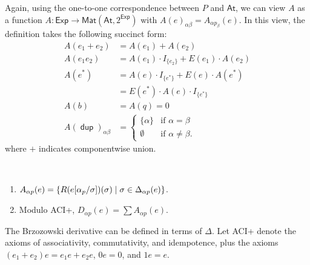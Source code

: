\documentclass{article}
\newcommand\At{\ensuremath{\mathsf{At}}}
\newcommand\ssum{\mathop{\textstyle\sum}}
\newcommand\pdup{\mathop{\mathsf{dup}}}
\newcommand\Exp{\mathsf{Exp}}
\renewcommand\star{^{\textstyle *}}
\renewcommand\powerset[1]{2^{#1}}
\newcommand\repname{R}
\newcommand\rep[2]{\repname(#2)(#1)}
\newcommand\STD{\Delta}
\newcommand\Anti{A}
\newcommand\Mat[2]{\mathsf{Mat}(#1,#2)}
\begin{document}
Again, using the one-to-one correspondence between $P$ and $\At$, we can view $A$ as a function $A:\Exp\to\Mat\At{\powerset\Exp}$
with $A(e)_{\alpha\beta}=A_{\alpha p_\beta}(e)$. In this view, the definition takes the following succinct form:
\begin{align*}
\Anti(e_1+e_2) &= \Anti(e_1) + \Anti(e_2)\nonumber\\
\Anti(e_1e_2) &= \Anti(e_1)\cdot I_{\{e_2\}} + E(e_1)\cdot\Anti(e_2)\nonumber\\
\Anti(e\star) &= \Anti(e)\cdot I_{\{e^*\}} + E(e)\cdot\Anti(e\star)\\
&= E(e\star)\cdot\Anti(e)\cdot I_{\{e^*\}}\\
\Anti(b) &= \Anti(q) = 0\nonumber\\
\Anti(\pdup)_{\alpha\beta} &= \begin{cases}
\{\alpha\} & \text{if $\alpha=\beta$}\\
\emptyset & \text{if $\alpha\neq\beta$.}\end{cases}\nonumber
\end{align*}
where $+$ indicates componentwise union.

\begin{lemma}
\label{eq:DDelta}\ 
\begin{enumerate}[{\upshape (i)}]
\item
$\Anti_{\alpha p}(e) = \set{\rep\sigma{e\subst{\alpha_p}\sigma}}{\sigma\in\STD_{\alpha p}(e)}$.
\item
Modulo ACI+, $D_{\alpha p}(e) = \ssum\Anti_{\alpha p}(e)$.
\end{enumerate}
\end{lemma}



The Brzozowski derivative can be defined in terms of $\STD$.
Let ACI+ denote the axioms of associativity, commutativity, and idempotence, plus the axioms $(e_1+e_2)e = e_1e + e_2e$, $0e = 0$, and $1e = e$.
\end{document}
